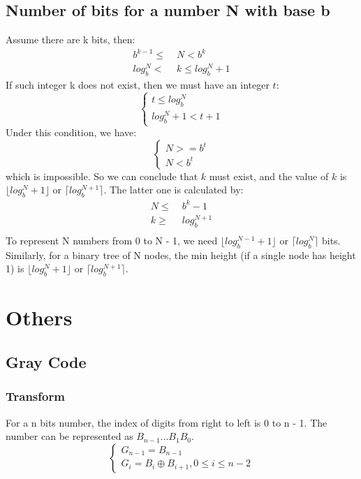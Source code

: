 \documentclass{article}
\begin{document}
  \subsection{Number of bits for a number N with base b}
    Assume there are k bits, then:
    \begin{align*}
      b^{k-1} \leq& \;N < b^k \\
      log_b^N <& \;k \leq log_b^{N} + 1
    \end{align*}
    If such integer k does not exist, then we must have an integer $t$:
    \begin{equation*}
      \begin{cases}
        t \leq log_b^N \\
        log_b^N + 1 < t + 1
      \end{cases}
    \end{equation*}
    Under this condition, we have:
    \begin{equation*}
      \begin{cases}
        N >= b^t \\
        N < b^t
      \end{cases}
    \end{equation*}
    which is impossible. So we can conclude that $k$ must exist, and the value of $k$ is $\lfloor log_b^N + 1 \rfloor$ or $\lceil log_b^{N + 1} \rceil$.
    The latter one is calculated by:
    \begin{align*}
      N \leq& \;b^k - 1 \\
      k \geq& \;log_b^{N + 1} \\
    \end{align*}
    To represent N numbers from 0 to N - 1, we need $\lfloor log_b^{N-1} + 1 \rfloor$ or $\lceil log_b^N \rceil$ bits. \\
    Similarly, for a binary tree of N nodes, the min height (if a single node has height 1) is $\lfloor log_b^N + 1 \rfloor$ or $\lceil log_b^{N + 1} \rceil$.

\section{Others}
  \subsection{Gray Code}
    \subsubsection{Transform}
      For a n bits number, the index of digits from right to left is 0 to n - 1. The number can be represented as
      $B_{n-1}...B_{1}B_{0}$.
      \begin{equation*}
        \begin{cases}
          G_{n-1} = B_{n-1} \\
          G_{i} = B_{i} \oplus B_{i+1}, 0 \leq i \leq n - 2
        \end{cases}
      \end{equation*}
\end{document}
